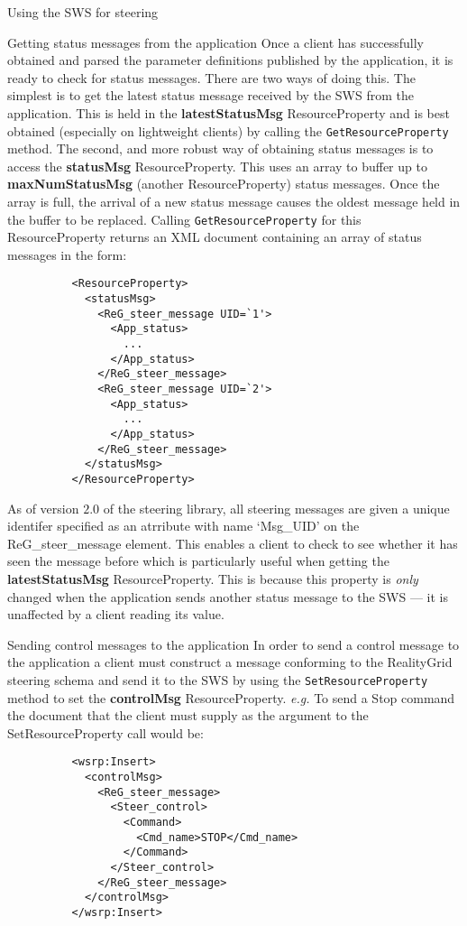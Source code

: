 \documentclass[a4paper]{article}
\begin{document}
\begin{section}{Using the SWS for steering}
\begin{subsection}{Getting status messages from the application}
Once a client has successfully obtained and parsed the parameter
definitions published by the application, it is ready to check for
status messages.  There are two ways of doing this.  The simplest is
to get the latest status message received by the SWS from the
application.  This is held in the {\bf latestStatusMsg} ResourceProperty and
is best obtained (especially on lightweight clients) by calling the
\texttt{GetResourceProperty} method.  The second, and more robust way of
obtaining status messages is to access the {\bf statusMsg} ResourceProperty.
This uses an array to buffer up to {\bf maxNumStatusMsg} (another
ResourceProperty) status messages.  Once the array is full, the
arrival of a new status message causes the oldest message held in the
buffer to be replaced.  Calling \texttt{GetResourceProperty} for this
ResourceProperty returns an XML document containing an array of status
messages in the form:
\begin{verbatim}
          <ResourceProperty>
            <statusMsg>
              <ReG_steer_message UID=`1'>
                <App_status>
                  ...
                </App_status>
              </ReG_steer_message>
              <ReG_steer_message UID=`2'>
                <App_status>
                  ...
                </App_status>
              </ReG_steer_message>
            </statusMsg>
          </ResourceProperty>
\end{verbatim}

As of version $2.0$ of the steering library, all steering messages are
given a unique identifer specified as an atrribute with name `Msg\_UID' on
the ReG\_steer\_message element.  This enables a client to check to see
whether it has seen the message before which is particularly useful
when getting the  {\bf latestStatusMsg} ResourceProperty.  This is because
this property is {\em only} changed when the application sends another
status message to the SWS --- it is unaffected by a client reading its
value.
\end{subsection}

\begin{subsection}{Sending control messages to the application}
In order to send a control message to the application a client must
construct a message conforming to the RealityGrid steering schema and
send it to the SWS by using the \texttt{SetResourceProperty} method to
set the {\bf controlMsg} ResourceProperty. {\it e.g.} To send a Stop
command the document that the client must supply as the argument to
the SetResourceProperty call would be:
\begin{verbatim}
          <wsrp:Insert>
            <controlMsg>
              <ReG_steer_message>
                <Steer_control>
                  <Command>
                    <Cmd_name>STOP</Cmd_name>
                  </Command>
                </Steer_control>
              </ReG_steer_message>
            </controlMsg>
          </wsrp:Insert>
\end{verbatim}
\end{subsection}


\end{section}
\end{document}

